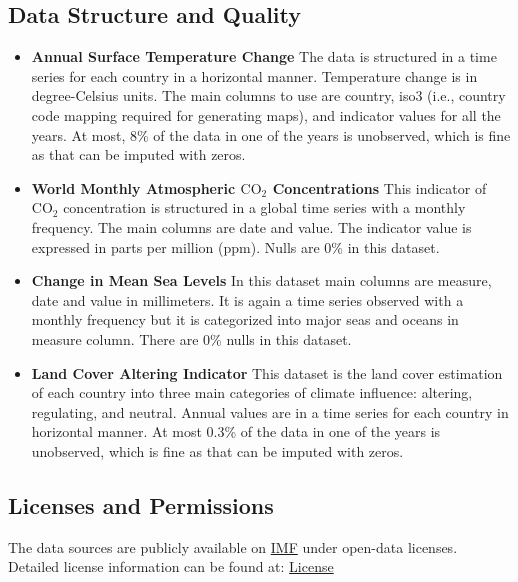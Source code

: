 \documentclass[a4paper,11pt]{article}
\begin{document}
\subsection{Data Structure and Quality}
\begin{itemize}
    \item \textbf{Annual Surface Temperature Change} The data is structured in a time series for each country in a horizontal manner. Temperature change is in degree-Celsius units. The main columns to use are country, iso3 (i.e., country code mapping required for generating maps), and indicator values for all the years. At most, 8\% of the data in one of the years is unobserved, which is fine as that can be imputed with zeros.
    
    \item \textbf{World Monthly Atmospheric \(\text{CO}_2\) Concentrations} This indicator of \(\text{CO}_2\) concentration is structured in a global time series with a monthly frequency. The main columns are date and value. The indicator value is expressed in parts per million (ppm). Nulls are 0\% in this dataset.

    \item \textbf{Change in Mean Sea Levels} In this dataset main columns are measure, date and value in millimeters. It is again a time series observed with a monthly frequency but it is categorized into major seas and oceans in measure column. There are 0\% nulls in this dataset.

    \item \textbf{Land Cover Altering Indicator} This dataset is the land cover estimation of each country into three main categories of climate influence: altering, regulating, and neutral. Annual values are in a time series for each country in horizontal manner. At most 0.3\% of the data in one of the years is unobserved, which is fine as that can be imputed with zeros.

\end{itemize}

\subsection{Licenses and Permissions}
The data sources are publicly available on \href{https://climatedata.imf.org/}{IMF} under open-data licenses. Detailed license information can be found at:
\href{https://www.imf.org/external/terms.htm}{License}
\end{document}
